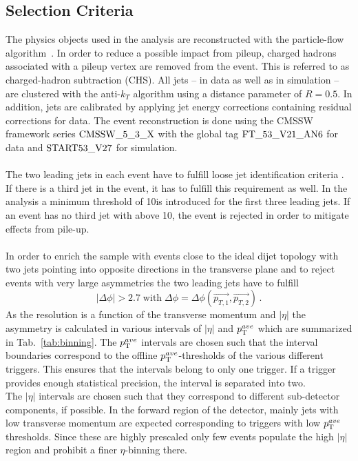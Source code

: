 \subsection{Selection Criteria}
\label{subsec:jer_sel_cuts}
The physics objects used in the analysis are reconstructed with the particle-flow algorithm~\cite{CMS-PAS-PFT-09-001}. In order to reduce a possible impact from pileup, charged hadrons associated with a pileup vertex are removed from the event. This is referred to as charged-hadron subtraction (CHS). All jets -- in data as well as in simulation -- are clustered with the anti-$k_T$ algorithm using a distance parameter of $R=0.5$. In addition, jets are calibrated by applying jet energy corrections containing residual corrections for data. The event reconstruction is done using the CMSSW framework series $\rm{CMSSW\_5\_3\_X}$ with the global tag $\rm{FT\_53\_V21\_AN6}$ for data and $\rm{START53\_V27}$ for simulation. \\
\\
The two leading jets in each event have to fulfill loose jet identification criteria . If there is a third jet in the event, it has to fulfill this requirement as well. In the analysis a minimum \pt threshold of 10\gev is introduced for the first three leading jets. If an event has no third jet with \pt above 10\gev, the event is rejected in order to mitigate effects from pile-up. \\
\\
In order to enrich the sample with events close to the ideal dijet topology with two jets pointing into opposite directions in the transverse plane and to reject events with very large asymmetries the two leading jets have to fulfill 
\begin{equation}
|\Delta \phi| > 2.7 \; \mathrm{with} \; \Delta \phi = \Delta \phi(\vec{p_{T,1}}, \vec{p_{T,2}}) \, .
\end{equation}
As the resolution is a function of the transverse momentum and $|\eta|$ the asymmetry is calculated in various intervals of $|\eta|$ and $p_{\text{T}}^{ave}$ which are summarized in Tab.~\ref{tab:binning}. The $p_{\text{T}}^{ave}$ intervals are chosen such that the interval boundaries correspond to the offline $p_{\text{T}}^{ave}$-thresholds of the various different triggers. This ensures that the intervals belong to only one trigger. If a trigger provides enough statistical precision, the interval is separated into two. \\
The $|\eta|$ intervals are chosen such that they correspond to different sub-detector components, if possible. In the forward region of the detector, mainly jets with low transverse momentum are expected corresponding to triggers with low $p_{\text{T}}^{ave}$ thresholds. Since these are highly prescaled only few events populate the high $|\eta|$ region and prohibit a finer $\eta$-binning there. \\
